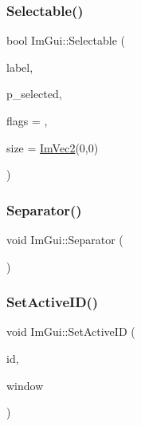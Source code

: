 \mbox{\label{namespace_im_gui_a9229a9c3c304ffc0c98ffe2ee4ff5e40}} 
\subsubsection{\texorpdfstring{Selectable()}{Selectable()}\hspace{0.1cm}{\footnotesize\ttfamily [2/2]}}
{\footnotesize\ttfamily bool Im\+Gui\+::\+Selectable (\begin{DoxyParamCaption}\item[{const char $\ast$}]{label,  }\item[{bool $\ast$}]{p\+\_\+selected,  }\item[{\mbox{\hyperlink{imgui_8h_aab0fe56421d75949dedfbfbbaa674b6b}{Im\+Gui\+Selectable\+Flags}}}]{flags = {},  }\item[{const \mbox{\hyperlink{struct_im_vec2}{Im\+Vec2}} \&}]{size = {\ttfamily \mbox{\hyperlink{struct_im_vec2}{Im\+Vec2}}(0,0)} }\end{DoxyParamCaption})}

\mbox{\label{namespace_im_gui_a191123597a5084d003c8beac7eeb029e}} 
\subsubsection{\texorpdfstring{Separator()}{Separator()}}
{\footnotesize\ttfamily void Im\+Gui\+::\+Separator (\begin{DoxyParamCaption}{ }\end{DoxyParamCaption})}

\mbox{\label{namespace_im_gui_a27b8ace13a8c421ee8405f0cbebe4ead}} 
\subsubsection{\texorpdfstring{Set\+Active\+I\+D()}{SetActiveID()}}
{\footnotesize\ttfamily void Im\+Gui\+::\+Set\+Active\+ID (\begin{DoxyParamCaption}\item[{\mbox{\hyperlink{imgui_8h_a1785c9b6f4e16406764a85f32582236f}{Im\+Gui\+ID}}}]{id,  }\item[{\mbox{\hyperlink{struct_im_gui_window}{Im\+Gui\+Window}} $\ast$}]{window }\end{DoxyParamCaption})}

